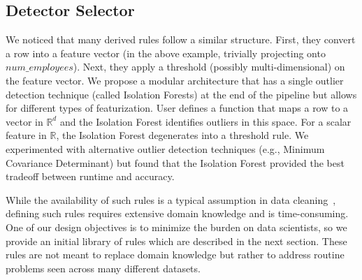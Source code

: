 \subsection{Detector Selector}
We noticed that many derived rules follow a similar structure.
First, they convert a row into a feature vector (in the above example, trivially projecting onto $num\_employees$).
Next, they apply a threshold (possibly multi-dimensional) on the feature vector.
We propose a modular architecture that has a single outlier detection technique (called Isolation Forests) at the end of the pipeline but allows for different types of featurization.
User defines a function that maps a row to a vector in $\mathbb{R}^d$ and the Isolation Forest identifies outliers in this space.
For a scalar feature in $\mathbb{R}$, the Isolation Forest degenerates into a threshold rule. 
We experimented with alternative outlier detection techniques (e.g., Minimum Covariance Determinant) but found that the Isolation Forest provided the best tradeoff between runtime and accuracy.

While the availability of such rules is a typical assumption in data cleaning~\cite{DBLP:conf/sigmod/ChuIKW16},  defining such rules requires extensive domain knowledge and is time-consuming.
One of our design objectives is to minimize the burden on data scientists, so we provide an initial library of rules which are described in the next section.
These rules are not meant to replace domain knowledge but rather to address routine problems seen across many different datasets.



